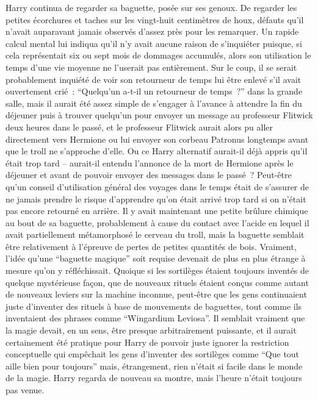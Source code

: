 Harry continua de regarder sa baguette, posée sur ses genoux.
De regarder les petites écorchures et taches sur les vingt-huit centimètres de houx, défauts qu'il n'avait auparavant jamais observés d'assez près pour les remarquer.
Un rapide calcul mental lui indiqua qu'il n'y avait aucune raison de s'inquiéter puisque, si cela représentait six ou sept mois de dommages accumulés, alors son utilisation le temps d'une vie moyenne ne l'userait pas entièrement.
Sur le coup, il se serait probablement inquiété de voir son retourneur de temps lui être enlevé s'il avait ouvertement crié~: “Quelqu'un a-t-il un retourneur de temps~?” dans la grande salle, mais il aurait été assez simple de s'engager à l'avance à attendre la fin du déjeuner puis à trouver quelqu'un pour envoyer un message au professeur Flitwick deux heures dans le passé, et le professeur Flitwick aurait alors pu aller directement vers Hermione ou lui envoyer son corbeau Patronus longtemps avant que le troll ne s'approche d'elle.
Ou ce Harry alternatif aurait-il déjà appris qu'il était trop tard -- aurait-il entendu l'annonce de la mort de Hermione après le déjeuner et avant de pouvoir envoyer des messages dans le passé~?
Peut-être qu'un conseil d'utilisation général des voyages dans le temps était de s'assurer de ne jamais prendre le risque d'apprendre qu'on était arrivé trop tard si on n'était pas encore retourné en arrière.
Il y avait maintenant une petite brûlure chimique au bout de sa baguette, probablement à cause du contact avec l'acide en lequel il avait partiellement métamorphosé le cerveau du troll, mais la baguette semblait être relativement à l'épreuve de pertes de petites quantités de bois.
Vraiment, l'idée qu'une “baguette magique” soit requise devenait de plus en plus étrange à mesure qu'on y réfléchissait.
Quoique si les sortilèges étaient toujours inventés de quelque mystérieuse façon, que de nouveaux rituels étaient conçus comme autant de nouveaux leviers sur la machine inconnue, peut-être que les gens continuaient juste d'inventer des rituels à base de mouvements de baguettes, tout comme ils inventaient des phrases comme “Wingardium Leviosa”.
Il semblait vraiment que la magie devait, en un sens, être presque arbitrairement puissante, et il aurait certainement été pratique pour Harry de pouvoir juste ignorer la restriction conceptuelle qui empêchait les gens d'inventer des sortilèges comme “Que tout aille bien pour toujours” mais, étrangement, rien n'était si facile dans le monde de la magie.
Harry regarda de nouveau sa montre, mais l'heure n'était toujours pas venue.

